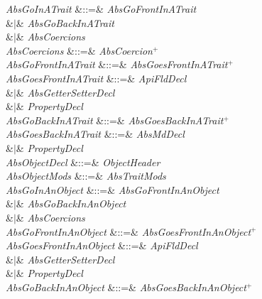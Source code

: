 \begin{GrammarTwo}
\emph{AbsGoInATrait}
&::=& 
\emph{AbsGoFrontInATrait} \\
&$|$& 
\emph{AbsGoBackInATrait} \\
&$|$& \emph{AbsCoercions}\\

\emph{AbsCoercions} &::=& \emph{AbsCoercion}$^+$\\

\emph{AbsGoFrontInATrait} &::=& \emph{AbsGoesFrontInATrait}$^+$\\

\emph{AbsGoesFrontInATrait}
&::=& \emph{ApiFldDecl} \\
&$|$& \emph{AbsGetterSetterDecl} \\
&$|$& \emph{PropertyDecl} \\

\emph{AbsGoBackInATrait} &::=& \emph{AbsGoesBackInATrait}$^+$\\

\emph{AbsGoesBackInATrait}
&::=& \emph{AbsMdDecl} \\
&$|$& \emph{PropertyDecl} \\

\emph{AbsObjectDecl} &::=& 
 \emph{ObjectHeader}  
\\

\emph{AbsObjectMods} &::=& \emph{AbsTraitMods}\\

\emph{AbsGoInAnObject}
&::=& 
\emph{AbsGoFrontInAnObject} \\
&$|$& 
\emph{AbsGoBackInAnObject} \\
&$|$& \emph{AbsCoercions}\\

\emph{AbsGoFrontInAnObject} &::=& \emph{AbsGoesFrontInAnObject}$^+$\\

\emph{AbsGoesFrontInAnObject}
&::=& \emph{ApiFldDecl} \\
&$|$& \emph{AbsGetterSetterDecl} \\
&$|$& \emph{PropertyDecl} \\

\emph{AbsGoBackInAnObject} &::=& \emph{AbsGoesBackInAnObject}$^+$\\


\end{GrammarTwo}
